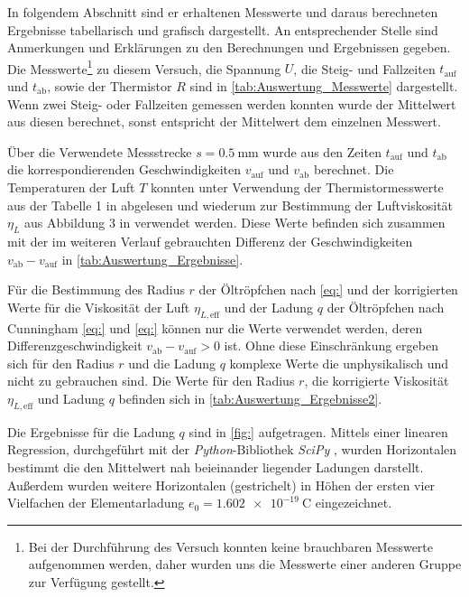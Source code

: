 In folgendem Abschnitt sind er erhaltenen Messwerte und daraus berechneten
Ergebnisse tabellarisch und grafisch dargestellt.
An entsprechender Stelle sind Anmerkungen und Erklärungen zu den Berechnungen 
und Ergebnissen gegeben.\\

Die Messwerte\footnote{Bei der Durchführung des Versuch konnten keine brauchbaren
Messwerte aufgenommen werden, daher wurden uns die Messwerte einer anderen Gruppe zur 
Verfügung gestellt.} zu diesem Versuch, die Spannung $U$, die Steig- und Fallzeiten $t_{\text{auf}}$ und 
$t_{\text{ab}}$, sowie der Thermistor $R$ sind in \cref{tab:Auswertung_Messwerte} dargestellt. 
Wenn zwei Steig- oder Fallzeiten gemessen werden konnten wurde der Mittelwert aus diesen berechnet,
sonst entspricht der Mittelwert dem einzelnen Messwert.
 
 
 



Über die Verwendete Messstrecke $s = \SI{0.5}{\mm}$ wurde aus den Zeiten $t_{\text{auf}}$ und $t_{\text{ab}}$ die
korrespondierenden Geschwindigkeiten $v_{\text{auf}}$ und $v_{\text{ab}}$ berechnet. Die Temperaturen der Luft 
$T$ konnten unter Verwendung der Thermistormesswerte aus der Tabelle 1 in \cite{V503} abgelesen und
wiederum zur Bestimmung der Luftviskosität $\eta_{L}$ aus Abbildung 3 in \cite{V503} verwendet werden.
Diese Werte befinden sich zusammen mit der im weiteren Verlauf gebrauchten Differenz der Geschwindigkeiten 
$v_{\text{ab}} - v_{\text{auf}}$ in \cref{tab:Auswertung_Ergebnisse}.  
 
	

Für die Bestimmung des Radius $r$ der Öltröpfchen nach \cref{eq:} und der korrigierten Werte für 
die Viskosität der Luft $\eta_{L,\text{eff}}$  und der Ladung $q$ der Öltröpfchen nach Cunningham \cref{eq:} und \cref{eq:} 
können nur die Werte verwendet werden, deren Differenzgeschwindigkeit $v_{\text{ab}} - v_{\text{auf}} > 0$ ist.
Ohne diese Einschränkung ergeben sich für den Radius $r$ und die Ladung $q$ komplexe Werte die unphysikalisch und 
nicht zu gebrauchen sind.
Die Werte für den Radius $r$, die korrigierte Viskosität $\eta_{L, \text{eff}}$ und Ladung $q$  befinden sich in 
\cref{tab:Auswertung_Ergebnisse2}.

	     
	 
Die Ergebnisse für die Ladung $q$ sind in \cref{fig:} aufgetragen. Mittels einer linearen Regression,
durchgeführt mit der \emph{Python}-Bibliothek \emph{SciPy} \cite{SciPy},
wurden Horizontalen bestimmt die den Mittelwert nah beieinander liegender Ladungen darstellt.
Außerdem wurden weitere Horizontalen (gestrichelt) in Höhen der ersten vier Vielfachen der
Elementarladung $e_{0} = \SI{1.602e-19}{\coulomb}$ \cite{SciPy} eingezeichnet.



